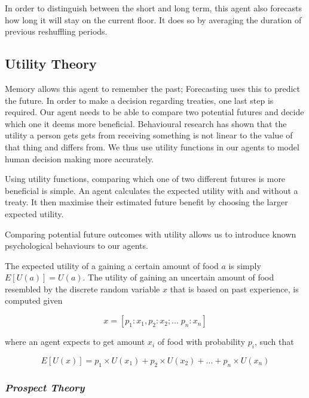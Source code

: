 In order to distinguish between the short and long term, this agent also forecasts how long it will stay on the current floor. It does so by averaging the duration of previous reshuffling periods.

\subsection{Utility Theory}

Memory allows this agent to remember the past; Forecasting uses this to predict the future. In order to make a decision regarding treaties, one last step is required. Our agent needs to be able to compare two potential futures and decide which one it deems more beneficial. Behavioural research has shown that the utility a person gets gets from receiving something is not linear to the value of that thing and differs from. We thus use utility functions in our agents to model human decision making more accurately.\cite{fishburn1970utility}

Using utility functions, comparing which one of two different futures is more beneficial is simple. An agent calculates the expected utility with and without a treaty. It then maximise their estimated future benefit by choosing the larger expected utility.

Comparing potential future outcomes with utility allows us to introduce known psychological behaviours to our agents.

The expected utility of a gaining a certain amount of food $a$ is simply $E[U(a)] = U(a)$. The utility of gaining an uncertain amount of food resembled by the discrete random variable $x$ that is based on past experience, is computed given

\begin{equation} 
x = [ p_1: x_1, p_2: x_2; ... \;p_n: x_n]
\end{equation}

where an agent expects to get amount $x_i$ of food with probability $p_i$, such that

\begin{equation}
E[U(x)] = p_1 \times U(x_1) + p_2 \times U(x_2) + ... + p_n \times U(x_n)
\label{eq:expectedUtility}
\end{equation}

\subsubsection{\textit{Prospect Theory}}

